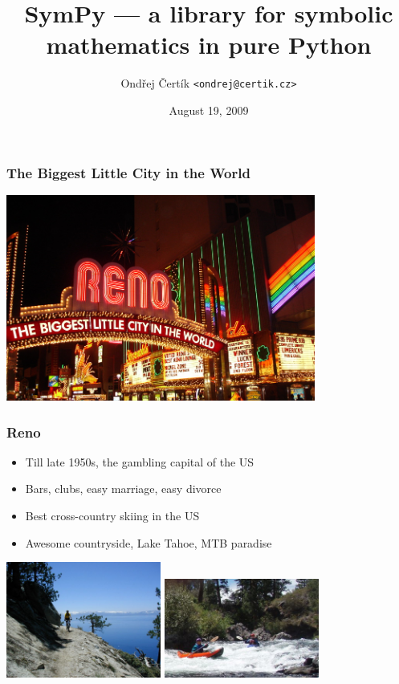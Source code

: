 \documentclass[handout]{beamer}
\title{SymPy --- a library for symbolic mathematics \linebreak in pure Python}
\author{Ondřej Čertík \texttt{<ondrej@certik.cz>}}
\institute[PWR]{University of Nevada, Reno\linebreak SymPy Development Team}
\date{August 19, 2009}
\begin{document}

\frame{\titlepage}

\begin{frame}[fragile]
    \frametitle{The Biggest Little City in the World}
    \begin{center}
        \includegraphics[width=4in]{images/Renoarch.jpg}
    \end{center}
\end{frame}

\begin{frame}[fragile]
    \frametitle{Reno}
    \begin{itemize}
        \item Till late 1950s, the gambling capital of the US
        \item Bars, clubs, easy marriage, easy divorce
        \item Best cross-country skiing in the US
        \item Awesome countryside, Lake Tahoe, MTB paradise
    \end{itemize}
    \begin{center}
        \includegraphics[width=2in]{images/tahoe1.jpg}
        \includegraphics[width=2in]{images/truckee1.jpg}
    \end{center}
\end{frame}
\end{document}
